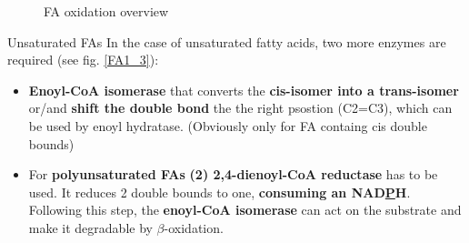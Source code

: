\documentclass[../main.tex]{subfiles}
\begin{document}
\begin{figure}[H]
	\centering
	\hfil
	\caption{FA oxidation overview}
\end{figure}

\begin{RemarkWithTitel}{Unsaturated FAs}
 	In the case of unsaturated fatty acids, two more enzymes are required (see fig. \ref{FA1_3}): 
 	\begin{itemize}
 		\item \textbf{Enoyl-CoA isomerase} that converts the \textbf{cis-isomer into a trans-isomer} or/and \textbf{shift the double bond} the the right psostion (C2=C3), which can be used by enoyl hydratase. (Obviously only for FA containg cis double bounds)
 		\item For \textbf{polyunsaturated FAs} \textbf{(2) 2,4-dienoyl-CoA reductase} has to be used. It reduces 2 double bounds to one, \textbf{consuming an NAD\underline{P}H}. Following this step, the \textbf{enoyl-CoA isomerase} can act on the substrate and make it degradable by $\beta$-oxidation.
 	\end{itemize}

\end{RemarkWithTitel}
\end{document}
